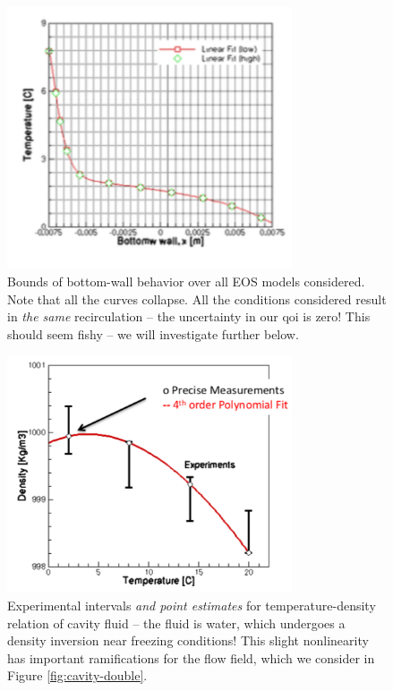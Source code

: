 \documentclass[../primer.tex]{subfiles}
\begin{document}
\begin{figure}[!ht]
  \includegraphics[width=0.75\textwidth]{./images/bot_wall_single}
  \caption{Bounds of bottom-wall behavior over all EOS models considered. Note
    that all the curves collapse. All the conditions considered result in
    \emph{the same} recirculation -- the uncertainty in our qoi is zero! This
    should seem fishy -- we will investigate further below.}
  \label{fig:bot-wall-single}
\end{figure}

\begin{figure}[!ht]
  \includegraphics[width=0.75\textwidth]{./images/density_poly}
  \caption{Experimental intervals \emph{and point estimates} for
    temperature-density relation of cavity fluid -- the fluid is water, which
    undergoes a density inversion near freezing conditions! This slight
    nonlinearity has important ramifications for the flow field, which we
    consider in Figure \ref{fig:cavity-double}.}
  \label{fig:density-poly}
\end{figure}
\end{document}
